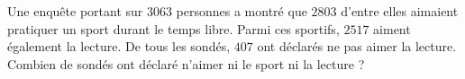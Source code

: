 
\begin{exercice}\label{exosmath-0232}

Une enquête portant sur $3063$ personnes a montré que $2803$ d'entre elles aimaient pratiquer un sport durant le temps libre. Parmi ces sportifs, $2517$ aiment également la lecture. De tous les sondés, $407$ ont déclarés ne pas aimer la lecture. Combien de sondés ont déclaré n'aimer ni le sport ni la lecture ?

\end{exercice}
